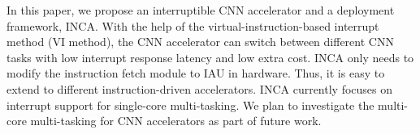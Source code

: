 \label{sec:conclusion}

In this paper, we propose an interruptible CNN accelerator and a deployment framework, INCA. 
With the help of the virtual-instruction-based interrupt method (VI method), the CNN accelerator can switch between different CNN tasks with low interrupt response latency and low extra cost. 
INCA only needs to modify the instruction fetch module to IAU in hardware. Thus, it is easy to extend to different instruction-driven accelerators.
INCA currently focuses on interrupt support for single-core multi-tasking. 
We plan to investigate the multi-core multi-tasking for CNN accelerators as part of future work.
